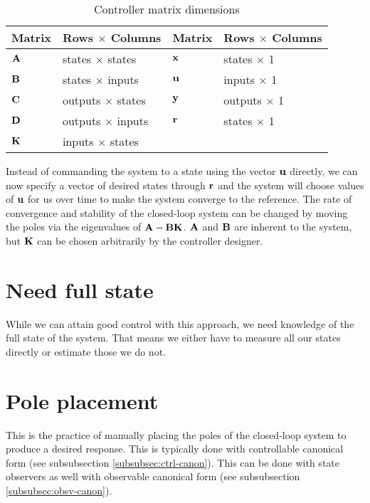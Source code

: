 \begin{table}[h]
  \renewcommand{\arraystretch}{1.5}
  \centering
  \begin{tabular}{|ll|ll|}
    \hline
    \rowcolor{headingbg}
    \textbf{Matrix} & \textbf{Rows $\times$ Columns} &
    \textbf{Matrix} & \textbf{Rows $\times$ Columns} \\
    \hline
    $\mathbf{A}$ & states $\times$ states & $\mathbf{x}$ & states $\times$ 1 \\
    $\mathbf{B}$ & states $\times$ inputs & $\mathbf{u}$ & inputs $\times$ 1 \\
    $\mathbf{C}$ & outputs $\times$ states & $\mathbf{y}$ & outputs $\times$ 1 \\
    $\mathbf{D}$ & outputs $\times$ inputs & $\mathbf{r}$ & states $\times$ 1 \\
    $\mathbf{K}$ & inputs $\times$ states &  &  \\
    \hline
  \end{tabular}
  \caption{Controller matrix dimensions}
  \label{tab:ctrl_matrix_dims}
\end{table}

Instead of commanding the system to a state using the vector $\mathbf{u}$ directly,
we can now specify a vector of desired states through $\mathbf{r}$ and the system
will choose values of $\mathbf{u}$ for us over time to make the system converge to
the reference. The rate of convergence and stability of the closed-loop system
can be changed by moving the poles via the eigenvalues of $\mathbf{A} -
\mathbf{B}\mathbf{K}$. $\mathbf{A}$ and $\mathbf{B}$ are inherent to the system, but
$\mathbf{K}$ can be chosen arbitrarily by the controller designer.

\section{Need full state}

While we can attain good control with this approach, we need knowledge of the
full state of the system. That means we either have to measure all our states
directly or estimate those we do not.

\section{Pole placement}

This is the practice of manually placing the poles of the closed-loop system to
produce a desired response. This is typically done with controllable canonical
form (see subsubsection \ref{subsubsec:ctrl-canon}). This can be done with state
observers as well with observable canonical form (see subsubsection
\ref{subsubsec:obsv-canon}).

